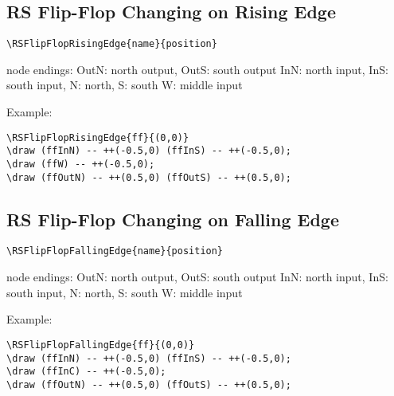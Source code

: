 \documentclass[parskip=full]{scrartcl}
\begin{document}
\subsection{RS Flip-Flop Changing on Rising Edge}

\begin{verbatim}
\RSFlipFlopRisingEdge{name}{position}
\end{verbatim}
node endings: OutN: north output, OutS: south output
              InN: north input, InS: south input,
              N: north, S: south
              W: middle input

Example:\\
\begin{minipage}{0.8\textwidth}
\begin{verbatim}
\RSFlipFlopRisingEdge{ff}{(0,0)}
\draw (ffInN) -- ++(-0.5,0) (ffInS) -- ++(-0.5,0);
\draw (ffW) -- ++(-0.5,0);
\draw (ffOutN) -- ++(0.5,0) (ffOutS) -- ++(0.5,0);
\end{verbatim}
\end{minipage}
\begin{minipage}{0.19\textwidth}
\end{minipage}

\subsection{RS Flip-Flop Changing on Falling Edge}

\begin{verbatim}
\RSFlipFlopFallingEdge{name}{position}
\end{verbatim}
node endings: OutN: north output, OutS: south output
              InN: north input, InS: south input,
              N: north, S: south
              W: middle input

Example:\\
\begin{minipage}{0.8\textwidth}
\begin{verbatim}
\RSFlipFlopFallingEdge{ff}{(0,0)}
\draw (ffInN) -- ++(-0.5,0) (ffInS) -- ++(-0.5,0);
\draw (ffInC) -- ++(-0.5,0);
\draw (ffOutN) -- ++(0.5,0) (ffOutS) -- ++(0.5,0);
\end{verbatim}
\end{minipage}
\begin{minipage}{0.19\textwidth}
\end{minipage}
\end{document}
